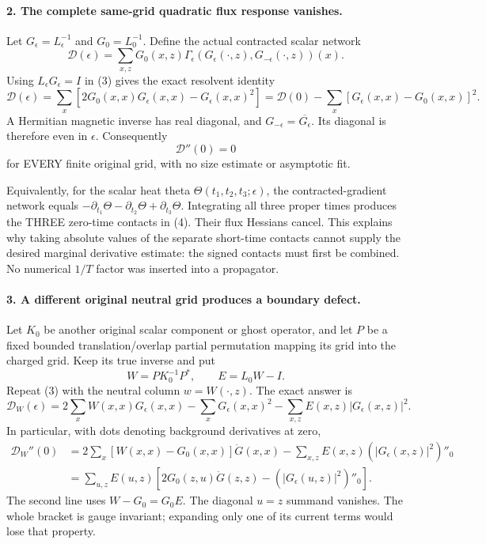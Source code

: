 \documentclass[11pt]{article}
\begin{document}
\paragraph{2. The complete same-grid quadratic flux response vanishes.}
Let $G_\epsilon=L_\epsilon^{-1}$ and $G_0=L_0^{-1}$. Define the actual
contracted scalar network
\[
 \mathcal D(\epsilon)=\sum_{x,z}G_0(x,z)
 \Gamma_\epsilon(G_\epsilon(\cdot,z),G_{-\epsilon}(\cdot,z))(x).
\]
Using $L_\epsilon G_\epsilon=I$ in (3) gives the exact resolvent identity
\[
 \boxed{\mathcal D(\epsilon)=\sum_x
 [2G_0(x,x)G_\epsilon(x,x)-G_\epsilon(x,x)^2]
 =\mathcal D(0)-\sum_x[G_\epsilon(x,x)-G_0(x,x)]^2.}              \tag{4}
\]
A Hermitian magnetic inverse has real diagonal, and
$G_{-\epsilon}=\overline{G_\epsilon}$. Its diagonal is therefore even
in $\epsilon$. Consequently
\[
 \boxed{\mathcal D''(0)=0}                                        \tag{5}
\]
for EVERY finite original grid, with no size estimate or asymptotic fit.

Equivalently, for the scalar heat theta $\Theta(t_1,t_2,t_3;\epsilon)$,
the contracted-gradient network equals
$-\partial_{t_1}\Theta-\partial_{t_2}\Theta+\partial_{t_3}\Theta$.
Integrating all three proper times produces the THREE zero-time contacts
in (4). Their flux Hessians cancel. This explains why taking absolute
values of the separate short-time contacts cannot supply the desired
marginal derivative estimate: the signed contacts must first be combined.
No numerical $1/T$ factor was inserted into a propagator.

\paragraph{3. A different original neutral grid produces a boundary defect.}
Let $K_0$ be another original scalar component or ghost operator, and let
$P$ be a fixed bounded translation/overlap partial permutation mapping its
grid into the charged grid. Keep its true inverse and put
\[
 W=P K_0^{-1}P^*,\qquad E=L_0 W-I.
\]
Repeat (3) with the neutral column $w=W(\cdot,z)$. The exact answer is
\[
 \boxed{\mathcal D_W(\epsilon)=
 2\sum_x W(x,x)G_\epsilon(x,x)-\sum_xG_\epsilon(x,x)^2
             -\sum_{x,z}E(x,z)|G_\epsilon(x,z)|^2.}               \tag{6}
\]
In particular, with dots denoting background derivatives at zero,
\begin{align}
 \mathcal D_W''(0)
 &=2\sum_x[W(x,x)-G_0(x,x)]\ddot G(x,x)
             -\sum_{x,z}E(x,z)(|G_\epsilon(x,z)|^2)''_0\\
 &=\sum_{u,z}E(u,z)
 [2G_0(z,u)\ddot G(z,z)-(|G_\epsilon(u,z)|^2)''_0].              \tag{7}
\end{align}
The second line uses $W-G_0=G_0E$. The diagonal $u=z$ summand vanishes.
The whole bracket is gauge invariant; expanding only one of its current
terms would lose that property.
\end{document}
